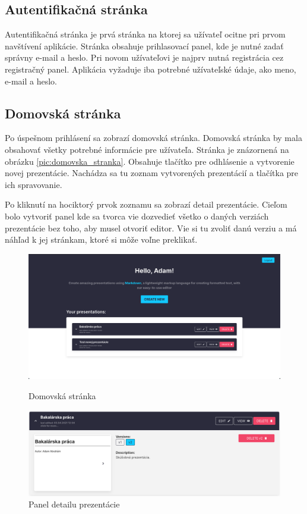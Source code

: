 \subsection*{Autentifikačná stránka}
Autentifikačná stránka je prvá stránka na ktorej sa užívateľ ocitne pri prvom navštívení aplikácie. Stránka obsahuje prihlasovací panel, kde je nutné zadať správny e-mail a heslo. Pri novom užívateľovi je najprv nutná registrácia cez registračný panel. Aplikácia vyžaduje iba potrebné užívateľské údaje, ako meno, e-mail a heslo.

\subsection*{Domovská stránka}
Po úspešnom prihlásení sa zobrazí domovská stránka. Domovská stránka by mala obsahovať všetky potrebné informácie pre užívateľa. Stránka je znázornená na obrázku \ref{pic:domovska_stranka}. Obsahuje tlačítko pre odhlásenie a vytvorenie novej prezentácie. Nachádza sa tu zoznam vytvorených prezentácií a tlačítka pre ich spravovanie. 

Po kliknutí na hociktorý prvok zoznamu sa zobrazí detail prezentácie. Cieľom bolo vytvoriť panel kde sa tvorca vie dozvedieť všetko o daných verziách prezentácie bez toho, aby musel otvoriť editor. Vie si tu zvoliť danú verziu a má náhľad k jej stránkam, ktoré si môže voľne preklikať.

\begin{figure}[!hbt]
\centering
\begin{minipage}{.5\textwidth}
  \centering
  \includegraphics[scale=0.1]{obrazky/domovska_stranka.png}
  \caption{Domovská stránka}
  \label{pic:domovska_stranka}
\end{minipage}%
\begin{minipage}{.5\textwidth}
  \centering
  \includegraphics[scale=0.15]{obrazky/detail_prezentacie.png}
  \caption{Panel detailu prezentácie}
  \label{pic:detail_prezentacie}
\end{minipage}
\end{figure}

